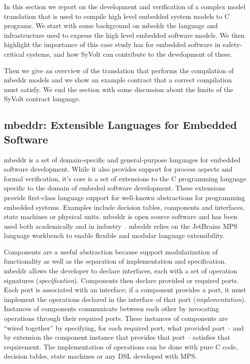 
In this section we report on the development and verification of a complex model
translation that is used to compile high level embedded
system models to C programs. We start with some background on mbeddr the
language and infrastructure used to express the high level embedded software
models. We then highlight the importance of this case study has for embedded
software in safety-critical systems, and how SyVolt can contribute to the
development of these.

Then we give an overview of the translation that performs the compilation of
mbeddr models and we show an example contract that a correct compilation must
satisfy. We end the section with some discussion about the limits of the SyVolt
contract language.

\subsection{mbeddr: Extensible Languages for Embedded Software}

mbeddr\cite{Voelter:2012:MEC:2384716.2384767} is a set of domain-specific and
general-purpose languages for embedded software development. While it also
provides support for process aspects and formal verification, it's core is a set
of extensions to the C programming language specific to the domain of embeded
software development. These extensions provide first-class language support for
well-known abstractions for programming embedded systems. Examples include
decision tables, components and interfaces, state machines or physical units.
mbeddr is open source software and has been used both academically and in
industry~\cite{Voelter2013,Voelter2014,mry_et_al:DR:2014:454,mbeddrSM}. mbeddr
relies on the JetBrains MPS language workbench to enable flexible and modular
language extensibility.

Components are a useful abstraction because support modularization of
functionality as well as the separation of implementation and specification.
mbeddr allows the developer to declare interfaces, each with a set of operation
signatures (\emph{specification}). Components then declare provided or required
ports. Each port is associated with an interface; if a component provides a
port, it must implement the operations declared in the interface of that port
(\emph{implementation}). Instances of components communicate between each other
by invocating operations through their required ports. These instances of
components are ``wired together'' by specifying, for each required port, what
provided port -- and by extension the component instance that provides that port
-- satisfies that requirement.
The implementation of operations can be done with pure C code, decision tables,
state machines or any DSL developed with MPS.

